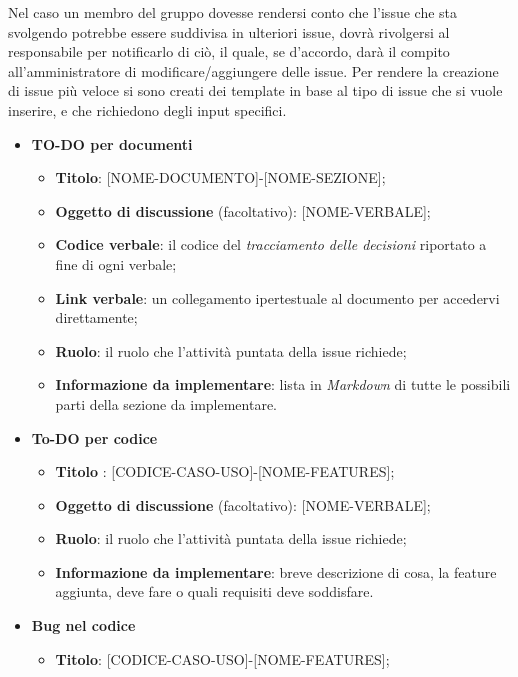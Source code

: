         Nel caso un membro del gruppo dovesse rendersi conto che l'issue che sta svolgendo potrebbe essere
        suddivisa in ulteriori issue, dovrà rivolgersi al responsabile per notificarlo di ciò, il quale, se d'accordo,
        darà il compito all'amministratore di modificare/aggiungere delle issue.
        Per rendere la creazione di issue più veloce si sono creati dei template in base al tipo di issue che si vuole inserire, e che richiedono degli input
        specifici.
        \begin{itemize}
            \item  \textbf{TO-DO per documenti}
            \begin{itemize}
                \item \textbf{Titolo}: [NOME-DOCUMENTO]-[NOME-SEZIONE];
                \item \textbf{Oggetto di discussione} (facoltativo): [NOME-VERBALE];
                \item \textbf{Codice verbale}: il codice del \textit{tracciamento delle decisioni} riportato a fine di ogni verbale;
                \item \textbf{Link verbale}: un collegamento ipertestuale al documento per accedervi direttamente;
                \item \textbf{Ruolo}: il ruolo che l'attività puntata della issue richiede;
                \item \textbf{Informazione da implementare}: lista in \textit{Markdown} di tutte le possibili parti della sezione da implementare.
            \end{itemize}
            \item  \textbf{To-DO per codice}
            \begin{itemize}
                \item \textbf{Titolo} : [CODICE-CASO-USO]-[NOME-FEATURES];
                \item \textbf{Oggetto di discussione} (facoltativo): [NOME-VERBALE];
                \item \textbf{Ruolo}: il ruolo che l'attività puntata della issue richiede;
                \item \textbf{Informazione da implementare}: breve descrizione di cosa, la feature aggiunta, deve fare o quali requisiti deve soddisfare.
            \end{itemize}
            \item  \textbf{Bug nel codice}
            \begin{itemize}
                \item \textbf{Titolo}: [CODICE-CASO-USO]-[NOME-FEATURES];

\end{itemize}
\end{itemize}
